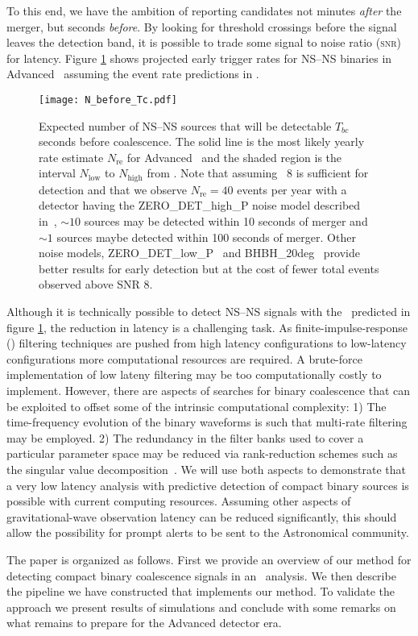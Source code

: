 To this end, we have the ambition of reporting candidates not minutes \emph{after} the merger, but seconds \emph{before}.  By looking for threshold crossings before the signal leaves the detection band, it is possible to trade some signal to noise ratio (\textsc{snr}) for latency.  Figure \ref{fig:earlywarning} shows projected early trigger rates for NS--NS binaries in Advanced \LIGO\
assuming the event rate predictions in \cite{Abadie:2010p10836}.
%
\begin{figure}
\texttt{[image: N\_before\_Tc.pdf]}
\caption{\label{fig:earlywarning} Expected number of NS--NS sources that will
be detectable $T_{bc}$ seconds before coalescence.  The solid line is the most
likely yearly rate estimate $N_{\mathrm{re}}$ for Advanced \LIGO\ and the
shaded region is the interval $N_{\mathrm{low}}$ to $N_{\mathrm{high}}$ from
\cite{Abadie:2010p10836}.  Note that assuming \SNR\ 8 is sufficient for
detection and that we observe $N_{\mathrm{re}} = 40$ events per year with a
detector having the ZERO\_DET\_high\_P noise model described
in~\cite{ALIGONoiseZERO_DET_high_P}, $\sim10$ sources may be detected within 10
seconds of merger and $\sim1$ sources maybe detected within 100 seconds of
merger.  Other noise models, ZERO\_DET\_low\_P~\cite{ALIGONoiseZERO_DET_low_P}
and BHBH\_20deg~\cite{ALIGONoiseBHBH_20deg} provide better results for early
detection but at the cost of fewer total events observed above SNR 8.}
\end{figure}

Although it is technically possible to detect NS--NS signals with the
\earlywarning\ predicted in figure \ref{fig:earlywarning}, the reduction in
latency is a challenging task.  As finite-impulse-response (\fir) filtering
techniques are pushed from high latency configurations to low-latency
configurations more computational resources are required.  A brute-force
implementation of low lateny filtering may be too computationally costly to
implement.  However, there are aspects of searches for binary coalescence that
can be exploited to offset some of the intrinsic computational complexity: 1)
The time-frequency evolution of the binary waveforms is such that multi-rate
filtering may be employed. 2) The redundancy in the filter banks used to cover
a particular parameter space may be reduced via rank-reduction schemes such as
the singular value decomposition~\cite{Cannon:2010p10398}. We will use both
aspects to demonstrate that a very low latency analysis with predictive
detection of compact binary sources is possible with current computing
resources.  Assuming other aspects of gravitational-wave observation latency
can be reduced significantly, this should allow the possibility for prompt
alerts to be sent to the Astronomical community.

The paper is organized as follows. First we provide an overview of our method
for detecting compact binary coalescence signals in an \earlywarning\
analysis. We then describe the pipeline we have constructed that implements
our method.  To validate the approach we present results of simulations and
conclude with some remarks on what remains to prepare for the Advanced
detector era.


